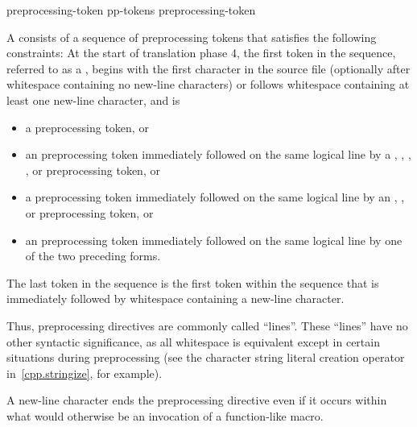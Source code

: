\begin{bnf}
\br
    preprocessing-token\br
    pp-tokens preprocessing-token
\end{bnf}

\begin{bnf}
\br
\end{bnf}

\pnum
A  consists of a sequence of preprocessing tokens
that satisfies the following constraints:
At the start of translation phase 4,
the first token in the sequence,
referred to as a ,
begins with the first character in the source file
(optionally after whitespace containing no new-line characters) or
follows whitespace containing at least one new-line character,
and is

\begin{itemize}
\item
a \tcode{\#} preprocessing token, or

\item
an  preprocessing token
immediately followed on the same logical line by a
,
\tcode{<},
,
, or
\tcode{:}
preprocessing token, or

\item
a  preprocessing token
immediately followed on the same logical line by an
,
\tcode{:}, or
\tcode{;}
preprocessing token, or

\item
an  preprocessing token
immediately followed on the same logical line by
one of the two preceding forms.
\end{itemize}

The last token in the sequence is the first token within the sequence that
is immediately followed by whitespace containing a new-line character.
\begin{footnote}
Thus,
preprocessing directives are commonly called ``lines''.
These ``lines'' have no other syntactic significance,
as all whitespace is equivalent except in certain situations
during preprocessing (see the
\tcode{\#}
character string literal creation operator in~\ref{cpp.stringize}, for example).
\end{footnote}
\begin{note}
A new-line character ends the preprocessing directive even if it occurs
within what would otherwise be an invocation of a function-like macro.
\end{note}

